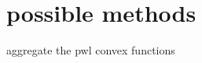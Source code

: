 \documentclass{beamer}
\begin{document}
\section{possible methods}

\begin{frame}{aggregate the pwl convex functions}
    
\end{frame}
\end{document}
